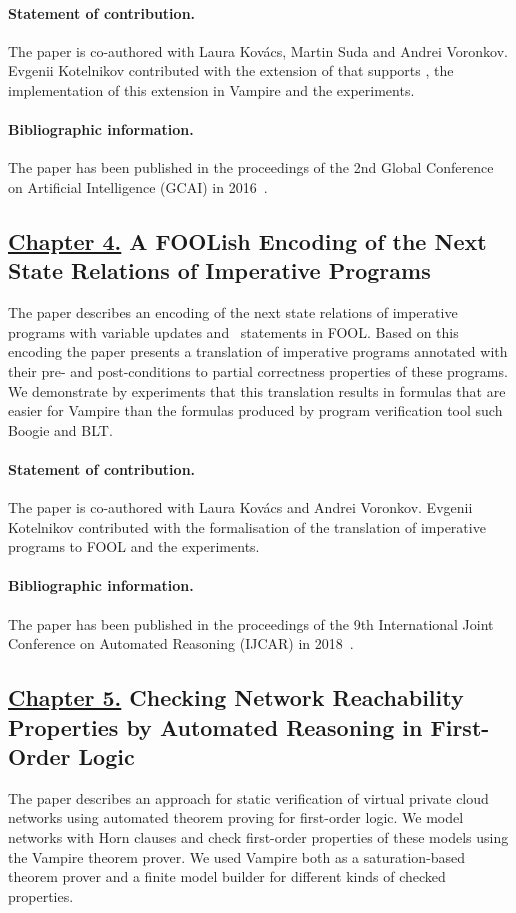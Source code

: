 \paragraph{Statement of contribution.} The paper is co-authored with Laura Kov\'{a}cs, Martin Suda and Andrei Voronkov. Evgenii Kotelnikov contributed with the extension of \newcnf{} that supports \folb{}, the implementation of this extension in Vampire and the experiments.

\paragraph{Bibliographic information.} The paper has been published in the proceedings of the 2nd Global Conference on Artificial Intelligence (GCAI) in 2016~\cite{FOOLCNF}.

\subsection*{\hyperref[chap:boogie]{Chapter 4.} A FOOLish Encoding of the Next State Relations of Imperative Programs}
The paper describes an encoding of the next state relations of imperative programs with variable updates and \ITE\ statements in FOOL. Based on this encoding the paper presents a translation of imperative programs annotated with their pre- and post-conditions to partial correctness properties of these programs. We demonstrate by experiments that this translation results in formulas that are easier for Vampire than the formulas produced by program verification tool such Boogie and BLT.

\paragraph{Statement of contribution.} The paper is co-authored with Laura Kov\'{a}cs and Andrei Voronkov. Evgenii Kotelnikov contributed with the formalisation of the translation of imperative programs to FOOL and the experiments.

\paragraph{Bibliographic information.} The paper has been published in the proceedings of the 9th International Joint Conference on Automated Reasoning (IJCAR) in 2018~\cite{KKV18}.

\subsection*{\hyperref[chap:aws]{Chapter 5.} Checking Network Reachability Properties by Automated Reasoning in First-Order Logic}
The paper describes an approach for static verification of virtual private cloud networks using automated theorem proving for first-order logic. We model networks with Horn clauses and check first-order properties of these models using the Vampire theorem prover. We used Vampire both as a saturation-based theorem prover and a finite model builder for different kinds of checked properties.

